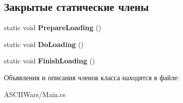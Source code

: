 \subsection*{Закрытые статические члены}
\begin{DoxyCompactItemize}
\item 
\hypertarget{class_a_s_c_i_i_wars_1_1_application_a17ad0a44229caa1044d99f975ed97be3}{}\label{class_a_s_c_i_i_wars_1_1_application_a17ad0a44229caa1044d99f975ed97be3} 
static void {\bfseries Prepare\+Loading} ()
\item 
\hypertarget{class_a_s_c_i_i_wars_1_1_application_a264d79af3a0048eef7ff8f864fdec698}{}\label{class_a_s_c_i_i_wars_1_1_application_a264d79af3a0048eef7ff8f864fdec698} 
static void {\bfseries Do\+Loading} ()
\item 
\hypertarget{class_a_s_c_i_i_wars_1_1_application_a56252f7621e7b373696a7a79d09a052f}{}\label{class_a_s_c_i_i_wars_1_1_application_a56252f7621e7b373696a7a79d09a052f} 
static void {\bfseries Finish\+Loading} ()
\end{DoxyCompactItemize}


Объявления и описания членов класса находятся в файле\+:\begin{DoxyCompactItemize}
\item 
A\+S\+C\+I\+I\+Wars/Main.\+cs\end{DoxyCompactItemize}
